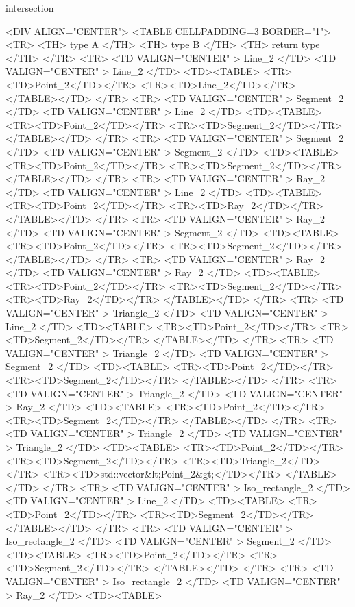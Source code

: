 \begin{ccRefFunction}{intersection}
\begin{ccHtmlOnly}
<DIV ALIGN="CENTER">
<TABLE CELLPADDING=3 BORDER="1">
<TR> <TH> type A </TH>
 <TH> type B </TH>
 <TH> return type </TH>
</TR>
<TR>
    <TD VALIGN="CENTER" > Line_2 </TD>
    <TD VALIGN="CENTER" > Line_2 </TD>
    <TD><TABLE>
	<TR><TD>Point_2</TD></TR>
	<TR><TD>Line_2</TD></TR>
        </TABLE></TD>
</TR>
<TR>
    <TD VALIGN="CENTER" > Segment_2 </TD>
    <TD VALIGN="CENTER" > Line_2 </TD>
    <TD><TABLE>
	<TR><TD>Point_2</TD></TR>
	<TR><TD>Segment_2</TD></TR>
      </TABLE></TD>
</TR>
<TR>
    <TD VALIGN="CENTER" > Segment_2 </TD>
    <TD VALIGN="CENTER" > Segment_2 </TD>
    <TD><TABLE>
	<TR><TD>Point_2</TD></TR>
	<TR><TD>Segment_2</TD></TR>
      </TABLE></TD>
</TR>
<TR>
    <TD VALIGN="CENTER" > Ray_2 </TD>
    <TD VALIGN="CENTER" > Line_2 </TD>
    <TD><TABLE>
	<TR><TD>Point_2</TD></TR>
	<TR><TD>Ray_2</TD></TR>
      </TABLE></TD>
</TR>
<TR>
    <TD VALIGN="CENTER" > Ray_2 </TD>
    <TD VALIGN="CENTER" > Segment_2 </TD>
    <TD><TABLE>
	<TR><TD>Point_2</TD></TR>
	<TR><TD>Segment_2</TD></TR>
      </TABLE></TD>
</TR>
<TR>
    <TD VALIGN="CENTER" > Ray_2 </TD>
    <TD VALIGN="CENTER" > Ray_2 </TD>
    <TD><TABLE>
	<TR><TD>Point_2</TD></TR>
	<TR><TD>Segment_2</TD></TR>
	<TR><TD>Ray_2</TD></TR>
      </TABLE></TD>
</TR>
<TR>
    <TD VALIGN="CENTER" > Triangle_2 </TD>
    <TD VALIGN="CENTER" > Line_2 </TD>
    <TD><TABLE>
	<TR><TD>Point_2</TD></TR>
	<TR><TD>Segment_2</TD></TR>
      </TABLE></TD>
</TR>
<TR>
    <TD VALIGN="CENTER" > Triangle_2 </TD>
    <TD VALIGN="CENTER" > Segment_2 </TD>
    <TD><TABLE>
	<TR><TD>Point_2</TD></TR>
	<TR><TD>Segment_2</TD></TR>
      </TABLE></TD>
</TR>
<TR>
    <TD VALIGN="CENTER" > Triangle_2 </TD>
    <TD VALIGN="CENTER" > Ray_2 </TD>
    <TD><TABLE>
	<TR><TD>Point_2</TD></TR>
	<TR><TD>Segment_2</TD></TR>
      </TABLE></TD>
</TR>
<TR>
    <TD VALIGN="CENTER" > Triangle_2 </TD>
    <TD VALIGN="CENTER" > Triangle_2 </TD>
    <TD><TABLE>
	<TR><TD>Point_2</TD></TR>
	<TR><TD>Segment_2</TD></TR>
	<TR><TD>Triangle_2</TD></TR>
	<TR><TD>std::vector&lt;Point_2&gt;</TD></TR>
      </TABLE></TD>
</TR>
<TR>
    <TD VALIGN="CENTER" > Iso_rectangle_2 </TD>
    <TD VALIGN="CENTER" > Line_2 </TD>
    <TD><TABLE>
	<TR><TD>Point_2</TD></TR>
	<TR><TD>Segment_2</TD></TR>
      </TABLE></TD>
</TR>
<TR>
    <TD VALIGN="CENTER" > Iso_rectangle_2 </TD>
    <TD VALIGN="CENTER" > Segment_2 </TD>
    <TD><TABLE>
	<TR><TD>Point_2</TD></TR>
	<TR><TD>Segment_2</TD></TR>
      </TABLE></TD>
</TR>
<TR>
    <TD VALIGN="CENTER" > Iso_rectangle_2 </TD>
    <TD VALIGN="CENTER" > Ray_2 </TD>
    <TD><TABLE>

\end{ccHtmlOnly}
\end{ccRefFunction}
